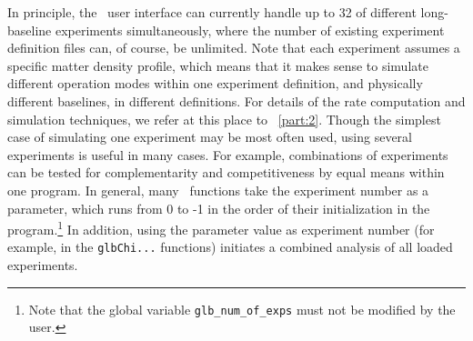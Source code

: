 In principle, the \GLOBES\ user interface can currently handle up to 32 of different long-baseline experiments simultaneously, where the number
of existing experiment definition files can, of course, be unlimited.  Note that each experiment
assumes a specific matter density profile, which means
that it makes sense to simulate different operation modes within one
experiment definition, and physically different baselines, in different
definitions. For details of the rate computation and
simulation techniques, we refer at this place to \Part~\ref{part:2}. Though
 the simplest case of simulating one experiment may be most often used, 
 using several experiments is useful in many cases. For example, combinations of experiments can be tested for
complementarity and competitiveness by equal means within one program.
In general, many \GLOBES\ functions take the experiment number as
a parameter, which runs from $0$ to -1 in the order of their initialization in the program.\footnote{Note that
the global variable {\tt glb\_num\_of\_exps} must not be modified by the
user.} In addition, using the parameter value  as
experiment number (for example, in the {\tt glbChi...} functions) initiates a combined analysis of all loaded experiments.

%

